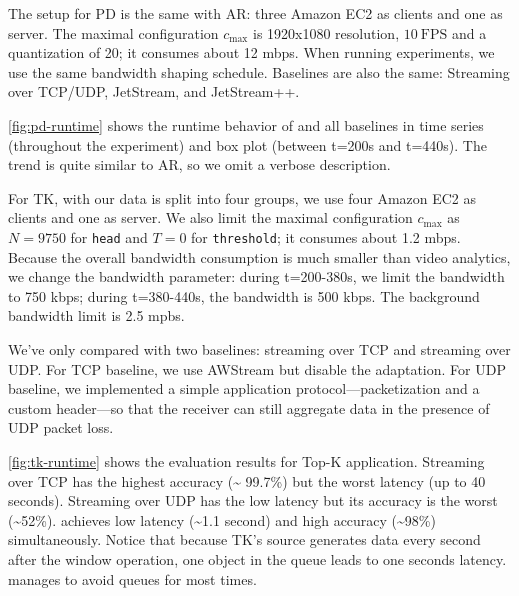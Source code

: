  The setup for PD is the same with AR: three Amazon
EC2 as clients and one as server. The maximal configuration $c_{\max}$ is
1920x1080 resolution, \(10~\text{FPS}\) and a quantization of 20; it consumes
about 12 mbps. When running experiments, we use the same bandwidth shaping
schedule. Baselines are also the same: Streaming over TCP/UDP, JetStream, and
JetStream++.

\autoref{fig:pd-runtime} shows the runtime behavior of \sysname{} and all
baselines in time series (throughout the experiment) and box plot (between
t=200s and t=440s). The trend is quite similar to AR, so we omit a verbose
description.

 For TK, with our data is split into four groups, we use four
Amazon EC2 as clients and one as server. We also limit the maximal configuration
$c_{\max}$ as $N=9750$ for \texttt{head} and $T=0$ for \texttt{threshold}; it
consumes about 1.2 mbps. Because the overall bandwidth consumption is much
smaller than video analytics, we change the bandwidth parameter: during
t=200-380s, we limit the bandwidth to 750 kbps; during t=380-440s, the bandwidth
is 500 kbps. The background bandwidth limit is 2.5 mpbs.

We've only compared \sysname{} with two baselines: streaming over TCP and
streaming over UDP. For TCP baseline, we use AWStream but disable the
adaptation. For UDP baseline, we implemented a simple application
protocol---packetization and a custom header---so that the receiver can still
aggregate data in the presence of UDP packet loss.

\autoref{fig:tk-runtime} shows the evaluation results for Top-K
application. Streaming over TCP has the highest accuracy (\textasciitilde
99.7\%) but the worst latency (up to 40 seconds). Streaming over UDP has the low
latency but its accuracy is the worst (\textasciitilde 52\%). \sysname{}
achieves low latency (\textasciitilde 1.1 second) and high accuracy
(\textasciitilde 98\%) simultaneously. Notice that because TK's source generates
data every second after the window operation, one object in the queue leads to
one seconds latency. \sysname{} manages to avoid queues for most times.


